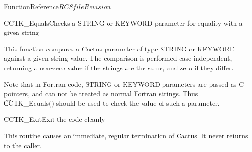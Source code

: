 \begin{cactuspart}{FunctionReference}{$RCSfile$}{$Revision$}
\begin{CCTKFunc}{CCTK\_Equals}{Checks a STRING or KEYWORD parameter for equality with a given string}
\label{CCTK-Equals}
\showargs
\begin{params}
\end{params}
\begin{discussion}
This function compares a Cactus parameter of type STRING or KEYWORD against a
given string value. The comparison is performed case-independent,
returning a non-zero value if the strings are the same, and zero if they differ.

Note that in Fortran code, STRING or KEYWORD parameters are passed as C pointers,
and can not be treated as normal Fortran strings. Thus {\t CCTK\_Equals()}
should be used to check the value of such a parameter.
\end{discussion}
\end{CCTKFunc}

\begin{CCTKFunc}{CCTK\_Exit}{Exit the code cleanly}
\label{CCTK-Exit}
\showargs
\begin{params}
\end{params}
\begin{discussion}
This routine causes an immediate, regular termination of Cactus.
It never returns to the caller.
\end{discussion}
\end{CCTKFunc}







\end{cactuspart}
